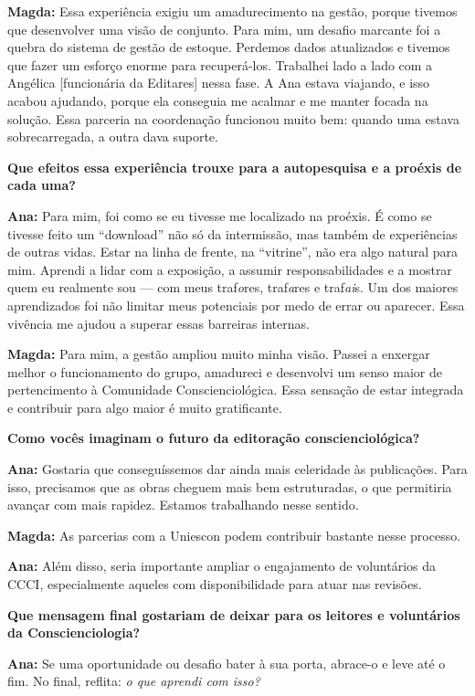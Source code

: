 \textbf{Magda:} Essa experiência exigiu um amadurecimento na gestão, porque tivemos que desenvolver uma visão de conjunto. Para mim, um desafio marcante foi a quebra do sistema de gestão de estoque. Perdemos dados atualizados e tivemos que fazer um esforço enorme para recuperá-los. Trabalhei lado a lado com a Angélica {[}funcionária da Editares{]} nessa fase. A Ana estava viajando, e isso acabou ajudando, porque ela conseguia me acalmar e me manter focada na solução. Essa parceria na coordenação funcionou muito bem: quando uma estava sobrecarregada, a outra dava suporte.

\textbf{Que efeitos essa experiência trouxe para a autopesquisa e a proéxis de cada uma?}

\textbf{Ana:} Para mim, foi como se eu tivesse me localizado na proéxis. É como se tivesse feito um ``download'' não só da intermissão, mas também de experiências de outras vidas. Estar na linha de frente, na ``vitrine'', não era algo natural para mim. Aprendi a lidar com a exposição, a assumir responsabilidades e a mostrar quem eu realmente sou --- com meus traf\emph{o}res, traf\emph{a}res e traf\emph{ai}s. Um dos maiores aprendizados foi não limitar meus potenciais por medo de errar ou aparecer. Essa vivência me ajudou a superar essas barreiras internas.

\textbf{Magda:} Para mim, a gestão ampliou muito minha visão. Passei a enxergar melhor o funcionamento do grupo, amadureci e desenvolvi um senso maior de pertencimento à Comunidade Conscienciológica. Essa sensação de estar integrada e contribuir para algo maior é muito gratificante.

\textbf{Como vocês imaginam o futuro da editoração conscienciológica?}

\textbf{Ana:} Gostaria que conseguíssemos dar ainda mais celeridade às publicações. Para isso, precisamos que as obras cheguem mais bem estruturadas, o que permitiria avançar com mais rapidez. Estamos trabalhando nesse sentido.

\textbf{Magda:} As parcerias com a Uniescon podem contribuir bastante nesse processo.

\textbf{Ana:} Além disso, seria importante ampliar o engajamento de voluntários da CCCI, especialmente aqueles com disponibilidade para atuar nas revisões.

\textbf{Que mensagem final gostariam de deixar para os leitores e voluntários da Conscienciologia?}

\textbf{Ana:} Se uma oportunidade ou desafio bater à sua porta, abrace-o e leve até o fim. No final, reflita: \emph{o que aprendi com isso?}

